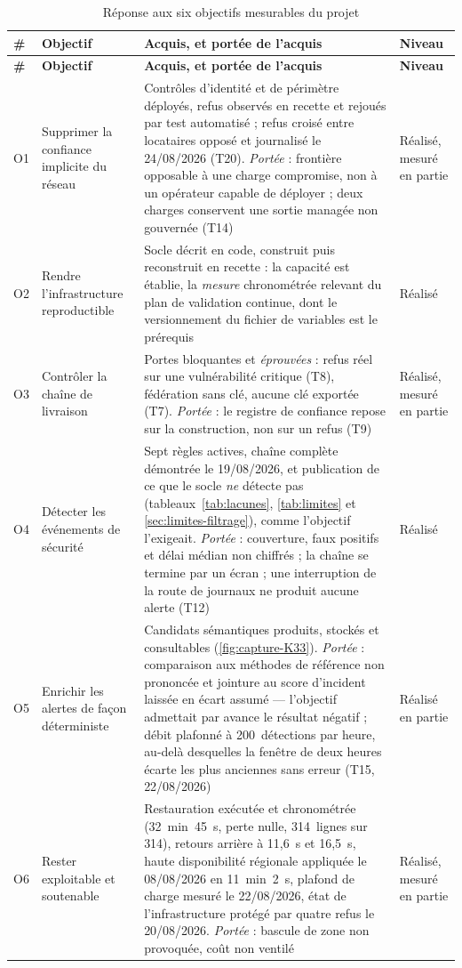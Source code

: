 {\footnotesize
\setlength{\tabcolsep}{3pt}
\begin{longtable}{|P{0.6cm}|P{2.6cm}|P{10.25cm}|P{1.6cm}|}
\caption{Réponse aux six objectifs mesurables du projet}
\label{tab:objectifs-ch6} \\
\hline
\textbf{\#} & \textbf{Objectif} & \textbf{Acquis, et portée de l'acquis} & \textbf{Niveau} \\
\hline
\endfirsthead
\hline
\textbf{\#} & \textbf{Objectif} & \textbf{Acquis, et portée de l'acquis} & \textbf{Niveau} \\
\hline
\endhead
O1 & Supprimer la confiance implicite du réseau & Contrôles d'identité et de périmètre déployés,
refus observés en recette et rejoués par test automatisé ; refus croisé entre locataires opposé et
journalisé le 24/08/2026 (T20). \emph{Portée} : frontière opposable à une charge compromise, non à
un opérateur capable de déployer ; deux charges conservent une sortie managée non gouvernée
(T14) & Réalisé, mesuré en partie \\ \hline
O2 & Rendre l'infrastructure reproductible & Socle décrit en code, construit puis reconstruit en
recette : la capacité est établie, la \emph{mesure} chronométrée relevant du plan de validation
continue, dont le versionnement du fichier de variables est le prérequis & Réalisé \\ \hline
O3 & Contrôler la chaîne de livraison & Portes bloquantes et \emph{éprouvées} : refus réel sur une
vulnérabilité critique (T8), fédération sans clé, aucune clé exportée (T7). \emph{Portée} : le
registre de confiance repose sur la construction, non sur un refus (T9) & Réalisé, mesuré en
partie \\ \hline
O4 & Détecter les événements de sécurité & Sept règles actives, chaîne complète démontrée le
19/08/2026, et publication de ce que le socle \emph{ne} détecte pas
(tableaux~\ref{tab:lacunes}, \ref{tab:limites} et \cref{sec:limites-filtrage}), comme l'objectif
l'exigeait. \emph{Portée} : couverture, faux positifs et délai médian non chiffrés ; la chaîne se
termine par un écran ; une interruption de la route de journaux ne produit aucune alerte (T12) &
Réalisé \\ \hline
O5 & Enrichir les alertes de façon déterministe & Candidats sémantiques produits, stockés et
consultables (\cref{fig:capture-K33}). \emph{Portée} : comparaison aux méthodes de référence non
prononcée et jointure au score d'incident laissée en écart assumé --- l'objectif admettait par
avance le résultat négatif ; débit plafonné à 200~détections par heure, au-delà desquelles la
fenêtre de deux heures écarte les plus anciennes sans erreur (T15, 22/08/2026) & Réalisé en
partie \\ \hline
O6 & Rester exploitable et soutenable & Restauration exécutée et chronométrée (32~min~45~s, perte
nulle, 314~lignes sur 314), retours arrière à 11,6~s et 16,5~s, haute disponibilité régionale
appliquée le 08/08/2026 en 11~min~2~s, plafond de charge mesuré le 22/08/2026, état de
l'infrastructure protégé par quatre refus le 20/08/2026. \emph{Portée} : bascule de zone non
provoquée, coût non ventilé & Réalisé, mesuré en partie \\
\hline
\end{longtable}
}

